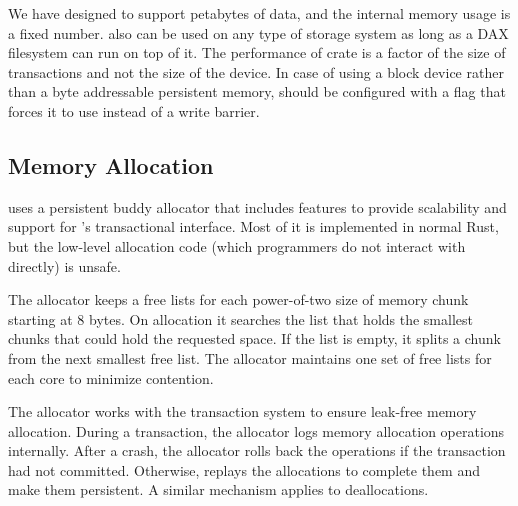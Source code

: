 We have designed \this{} to support petabytes of data, and the internal memory usage is a fixed number. \this{} also can be used on any type of storage system as long as a DAX filesystem can run on top of it. The performance of \this{} crate is a factor of the size of transactions and not the size of the device. In case of using a block device rather than a byte addressable persistent memory, \this{} should be configured with a flag that forces it to use \msync{} instead of a write barrier. 


\subsection{Memory Allocation}
\label{sec:mem-alloc}

\This{} uses a persistent buddy allocator that includes features
to provide scalability and support for \this{}'s transactional interface.  Most
of it is implemented in normal Rust, but the low-level allocation code (which
programmers do not interact with directly) is unsafe.

The allocator keeps a free lists for each power-of-two size of memory chunk starting at 8 bytes.  On allocation it searches the list that holds the smallest chunks that could hold the requested space.  If the list is empty, it splits a chunk from the next smallest free list.  The allocator maintains one set of free lists for each core to minimize contention.

The allocator works with the transaction system to ensure leak-free memory allocation.  During a transaction, the allocator logs memory allocation operations internally.  After a crash, the allocator rolls back the operations if the transaction had not committed.  Otherwise, replays the allocations to complete them and make them persistent.  A similar mechanism applies to deallocations.



